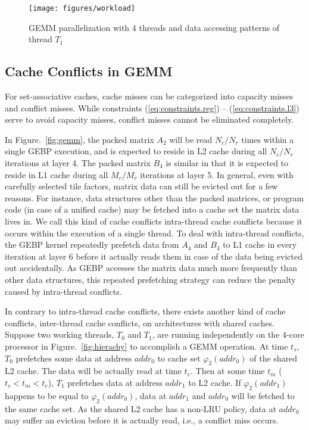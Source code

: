\begin{figure}[t]
  \centering
  \texttt{[image: figures/workload]}
  \caption{GEMM parallelization with 4 threads and data accessing patterns of thread $T_1$}
  \label{fig:workload}
\end{figure}

\subsection{Cache Conflicts in GEMM}\label{subsec:cache-conflicts}

For set-associative caches, cache misses can be categorized
into capacity misses and conflict misses.
While constraints (\ref{eq:constraints.reg}) -- (\ref{eq:constraints.l3})
serve to avoid capacity misses,
conflict misses cannot be eliminated completely.

In Figure.~\ref{fig:gemm}, the packed matrix $A_2$
will be read $N_c/N_r$ times within a single GEBP execution,
and is expected to reside in L2 cache during all $N_c/N_r$ iterations at layer 4.
The packed matrix $B_4$ is similar in that it is expected to
reside in L1 cache during all $M_c/M_r$ iterations at layer 5.
In general, even with carefully selected tile factors,
matrix data can still be evicted out for a few reasons.
For instance, data structures other than the packed matrices,
or program code (in case of a unified cache) may be fetched into a
cache set the matrix data lives in.
We call this kind of cache conflicts intra-thread cache conflicts
because it occurs within the execution of a single thread.
To deal with intra-thread conflicts,
the GEBP kernel repeatedly prefetch data from $A_4$ and $B_4$ to L1 cache
in every iteration at layer 6 before it actually reads them in case of
the data being evicted out accidentally.
As GEBP accesses the matrix data much more frequently than other
data structures, this repeated prefetching strategy
can reduce the penalty caused by intra-thread conflicts.

In contrary to intra-thread cache conflicts,
there exists another kind of cache conflicts,
inter-thread cache conflicts, on architectures with shared caches.
Suppose two working threads, $T_0$ and $T_1$, are running independently
on the 4-core processor in Figure.~\ref{fig:hierachy}
to accomplish a GEMM operation.
At time $t_s$, $T_0$ prefetches some data at address $addr_0$
to cache set $\varphi_2(addr_0)$ of the shared L2 cache.
The data will be actually read at time $t_e$.
Then at some time $t_m$ ($t_s < t_m < t_e$),
$T_1$ prefetches data at address $addr_1$ to L2 cache.
If $\varphi_2(addr_1)$ happens to be equal to $\varphi_2(addr_0)$,
data at $addr_1$ and $addr_0$ will be fetched to the same cache set.
As the shared L2 cache has a non-LRU policy,
data at $addr_0$ may suffer an eviction before it is actually read,
i.e., a conflict miss occurs.

